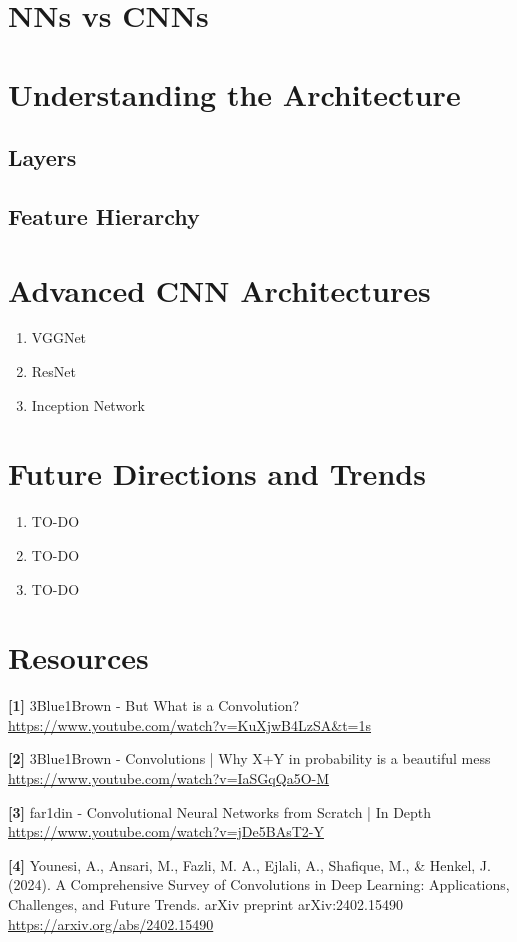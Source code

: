 \documentclass{article}
\begin{document}
\section{NNs vs CNNs}

\section{Understanding the Architecture}
    \subsection {Layers}
    \subsection {Feature Hierarchy}
    
\section{Advanced CNN Architectures}
    \begin{enumerate}[label=(\alph*)]
        \item VGGNet
        \item ResNet
        \item Inception Network
    \end{enumerate}
    
\section{Future Directions and Trends}
    \begin{enumerate}[label=(\alph*)]
        \item TO-DO
        \item TO-DO
        \item TO-DO
    \end{enumerate}

\section{Resources}
    \textbf{[1]} 3Blue1Brown - But What is a Convolution? \\
    \url{https://www.youtube.com/watch?v=KuXjwB4LzSA&t=1s}
    
    \textbf{[2]} 3Blue1Brown - Convolutions | Why X+Y in probability is a beautiful mess \\
    \url{https://www.youtube.com/watch?v=IaSGqQa5O-M}
    
    \textbf{[3]} far1din - Convolutional Neural Networks from Scratch | In Depth \\
    \url{https://www.youtube.com/watch?v=jDe5BAsT2-Y}
    
    \textbf{[4]} Younesi, A., Ansari, M., Fazli, M. A., Ejlali, A., Shafique, M., \& Henkel, J. (2024). A Comprehensive Survey of Convolutions in Deep Learning: Applications, Challenges, and Future Trends. arXiv preprint arXiv:2402.15490 \\
    \url{https://arxiv.org/abs/2402.15490}
\end{document}
